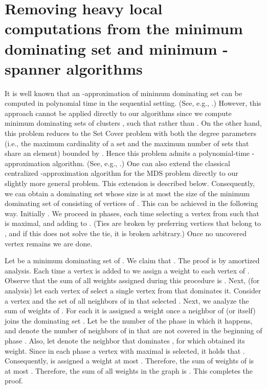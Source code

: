 \documentclass[11pt]{article}
\begin{document}
\section{Removing heavy local computations from the minimum dominating set and minimum -spanner algorithms} \label{sc:fast}
It is well known that an -approximation of minimum dominating set can be computed in polynomial time in the sequential setting. (See, e.g., \cite{W04}.) However, this approach cannot be applied directly to our algorithms since we compute minimum dominating sets  of clusters , such that  rather than .
On the other hand, this problem reduces to the Set Cover problem with both the degree parameters (i.e., the maximum cardinality of a set and the maximum number of sets that share an element) bounded by . Hence this problem admits a polynomial-time -approximation algorithm. (See, e.g., \cite{SS12}.) One can also extend the classical centralized -approximation algorithm for the MDS problem directly to our slightly more general problem. This extension is described below.
Consequently, we can obtain a dominating set whose size is at most  the size of the minimum dominating set of  consisting of vertices of . This can be achieved in the following way. Initially . We proceed in phases, each time selecting a vertex  from  such that  is maximal, and adding  to .  (Ties are broken by preferring vertices that belong to , and if this does not solve the tie, it is broken arbitrary.)  Once no uncovered vertex remains we are done.

Let  be a minimum dominating set of . We claim that . The proof is by amortized analysis. Each time a vertex  is added to  we assign a weight  to each vertex of . Observe that the sum of all weights assigned during this procedure is . Next, (for analysis) let each vertex of  select a single vertex from  that dominates it. Consider a vertex  and the set  of all neighbors of  in  that selected .
Next, we analyze the sum of weights of . For each  it is assigned a weight once a neighbor of  (or  itself) joins the dominating set . Let  be the number of the phase in which it happens, and  denote the number of neighbors of  in  that are not covered in the beginning of phase . Also, let  denote the neighbor that dominates , for which  obtained its weight. Since in each phase a vertex  with maximal  is selected, it holds that . Consequently,  is assigned a weight at most . Therefore, the sum of weights of  is at most . Therefore, the sum of all weights in the graph is . This completes the proof. 
\end{document}
